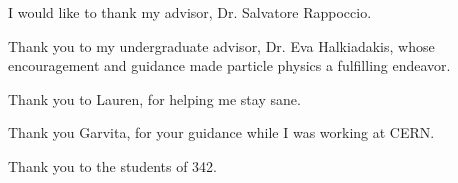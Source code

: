 
I would like to thank my advisor, Dr. Salvatore Rappoccio.



Thank you to my undergraduate advisor, Dr. Eva Halkiadakis, whose encouragement and guidance made particle physics a fulfilling endeavor.


Thank you to Lauren, for helping me stay sane.

Thank you Garvita, for your guidance while I was working at CERN.

Thank you to the students of 342.